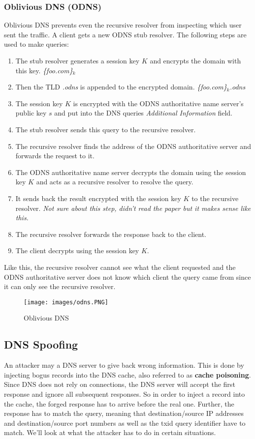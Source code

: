 \subsubsection{Oblivious DNS (ODNS)}
Oblivious DNS prevents even the recursive resolver from inspecting which user sent the traffic. A client gets a new ODNS stub resolver. The following steps are used to make queries:
\begin{enumerate}
\item The stub resolver generates a session key $K$ and encrypts the domain with this key. \textit{\{foo.com\}$_k$}
\item Then the TLD \textit{.odns} is appended to the encrypted domain. \textit{\{foo.com\}$_k$.odns}
\item The session key $K$ is encrypted with the ODNS authoritative name server's public key $s$ and put into the DNS queries \textit{Additional Information} field.
\item The stub resolver sends this query to the recursive resolver.
\item The recursive resolver finds the address of the ODNS authoritative server and forwards the request to it.
\item The ODNS authoritative name server decrypts the domain using the session key $K$ and acts as a recursive resolver to resolve the query.
\item It sends back the result encrypted with the session key $K$ to the recursive resolver. \textit{Not sure about this step, didn't read the paper but it makes sense like this.}
\item The recursive resolver forwards the response back to the client.
\item The client decrypts using the session key $K$.
\end{enumerate}
Like this, the recursive resolver cannot see what the client requested and the ODNS authoritative server does not know which client the query came from since it can only see the recursive resolver.
\begin{figure}[H]
\centering
\texttt{[image: images/odns.PNG]}
\label{odns}
\caption{Oblivious DNS}
\end{figure}

\subsection{DNS Spoofing}
An attacker may a DNS server to give back wrong information. This is done by injecting bogus records into the DNS cache, also referred to as \textbf{cache poisoning}. Since DNS does not rely on connections, the DNS server will accept the first response and ignore all subsequent responses. So in order to inject a record into the cache, the forged response has to arrive before the real one. Further, the response has to match the query, meaning that destination/source IP addresses and destination/source port numbers as well as the txid query identifier have to match. We'll look at what the attacker has to do in certain situations.

